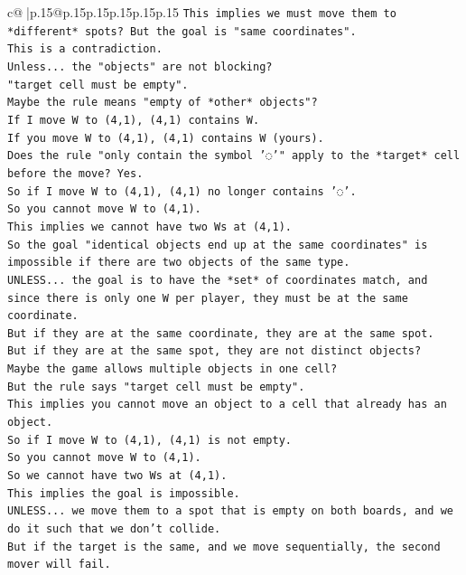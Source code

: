 \documentclass{article}
\begin{document}
{\begin{supertabular}{c@{$\;$}|p{.15\linewidth}@{}p{.15\linewidth}p{.15\linewidth}p{.15\linewidth}p{.15\linewidth}p{.15\linewidth}}
{{{\texttt{This implies we must move them to *different* spots? But the goal is "same coordinates".} \\
\texttt{This is a contradiction.} \\
\texttt{Unless... the "objects" are not blocking?} \\
\texttt{"target cell must be empty".} \\
\texttt{Maybe the rule means "empty of *other* objects"?} \\
\texttt{If I move W to (4,1), (4,1) contains W.} \\
\texttt{If you move W to (4,1), (4,1) contains W (yours).} \\
\texttt{Does the rule "only contain the symbol '◌'" apply to the *target* cell before the move? Yes.} \\
\texttt{So if I move W to (4,1), (4,1) no longer contains '◌'.} \\
\texttt{So you cannot move W to (4,1).} \\
\texttt{This implies we cannot have two Ws at (4,1).} \\
\texttt{So the goal "identical objects end up at the same coordinates" is impossible if there are two objects of the same type.} \\
\texttt{UNLESS... the goal is to have the *set* of coordinates match, and since there is only one W per player, they must be at the same coordinate.} \\
\texttt{But if they are at the same coordinate, they are at the same spot.} \\
\texttt{But if they are at the same spot, they are not distinct objects?} \\
\texttt{Maybe the game allows multiple objects in one cell?} \\
\texttt{But the rule says "target cell must be empty".} \\
\texttt{This implies you cannot move an object to a cell that already has an object.} \\
\texttt{So if I move W to (4,1), (4,1) is not empty.} \\
\texttt{So you cannot move W to (4,1).} \\
\texttt{So we cannot have two Ws at (4,1).} \\
\texttt{This implies the goal is impossible.} \\
\texttt{UNLESS... we move them to a spot that is empty on both boards, and we do it such that we don't collide.} \\
\texttt{But if the target is the same, and we move sequentially, the second mover will fail.} \\
}}}
\end{supertabular}}
\end{document}
